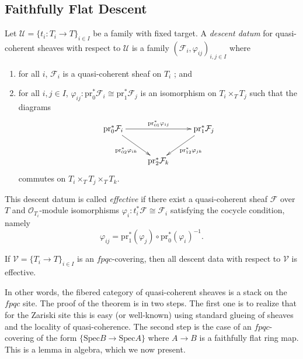 \subsection{Faithfully Flat Descent}

\begin{definition}
Let $\mathcal{U} = \{ t_i : T_i \to T\}_{i \in I}$ be a family with fixed target. A \emph{descent datum} for quasi-coherent sheaves with respect to $\mathcal{U}$ is a family $(\mathcal{F}_i, \varphi_{ij})_{i,j\in I}$ where
\begin{enumerate}
\item for all $i$, $\mathcal{F}_i$ is a quasi-coherent sheaf on $T_i$ ; and
\item for all $i, j \in I$, $\varphi_{ij} : \text{pr}_0^* \mathcal{F}_i \cong \text{pr}_1^* \mathcal{F}_j$ is an isomorphism on $T_i \times_T T_j$ such that the diagrams
$$
\xymatrix{
{\text{pr}_0^* \mathcal{F}_i} \ar_{\text{pr}_{02}^*\varphi_{ik}}[dr] \ar^{\text{pr}_{01}^*\varphi_{ij}}[rr] & & {\text{pr}_1^* \mathcal{F}_j}\ar^{\text{pr}_{12}^*\varphi_{jk}}[dl] \\
& {\text{pr}_2^* \mathcal{F}_k}  
}
$$ 
commutes on $T_i \times_T T_j \times_T T_k$.
\end{enumerate}

This descent datum is called \emph{effective} if there exist a quasi-coherent sheaf $\mathcal{F}$ over $T$ and $\mathcal{O}_{T_i}$-module isomorphisms $\varphi_i : t_i^* \mathcal{F} \cong \mathcal{F}_i$ satisfying the cocycle condition, namely
$$
\varphi_{ij} = \text{pr}_1^* (\varphi_j) \circ \text{pr}_0^* (\varphi_i)^{-1}.
$$ 
\end{definition}

\begin{theorem} \label{thm:DescentIsEffectiveForQCoh}
If $\mathcal{V} = \{T_i \to T\}_{i\in I}$ is an $fpqc$-covering, then all descent data with respect to $\mathcal{V}$ is effective.
\end{theorem}

In other words, the fibered category of quasi-coherent sheaves is a stack on the $fpqc$ site.
The proof of the theorem is in two steps. The first one is to realize that for the Zariski site this is easy (or well-known) using standard glueing of sheaves and the locality of quasi-coherence. The second step is the case of an $fpqc$-covering of the form $\{ \text{Spec} B \to \text{Spec} A\}$ where $A \to B$ is a faithfully flat ring map. This is a lemma in algebra, which we now present.

